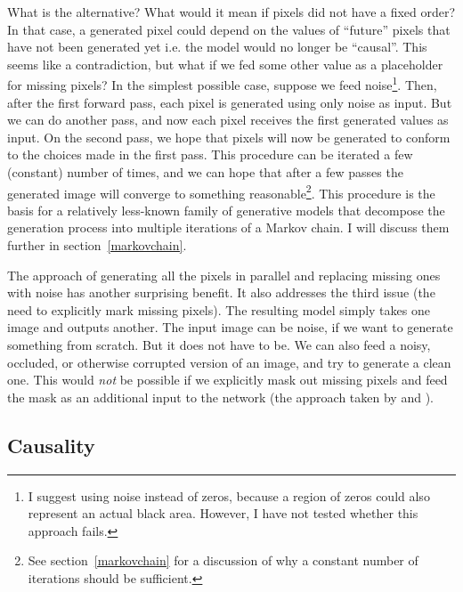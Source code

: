 \documentclass[11pt, a4paper, openany]{book}
\newcommand{\nquote}[1]{``{#1}''}
\begin{document}
What is the alternative? What would it mean if pixels did not have a fixed order? In that case, a generated pixel could depend on the values of \nquote{future} pixels that have not been generated yet i.e. the model would no longer be \nquote{causal}. This seems like a contradiction, but what if we fed some other value as a placeholder for missing pixels? In the simplest possible case, suppose we feed noise\footnote{I suggest using noise instead of zeros, because a region of zeros could also represent an actual black area. However, I have not tested whether this approach fails.}. Then, after the first forward pass, each pixel is generated using only noise as input. But we can do another pass, and now each pixel receives the first generated values as input. On the second pass, we hope that pixels will now be generated to conform to the choices made in the first pass. This procedure can be iterated a few (constant) number of times, and we can hope that after a few passes the generated image will converge to something reasonable\footnote{See section~\ref{markovchain} for a discussion of why a constant number of iterations should be sufficient.}. This procedure is the basis for a relatively less-known family of generative models that decompose the generation process into multiple iterations of a Markov chain. I will discuss them further in section~\ref{markovchain}.

The approach of generating all the pixels in parallel and replacing missing ones with noise has another surprising benefit. It also addresses the third issue (the need to explicitly mark missing pixels). The resulting model simply takes one image and outputs another. The input image can be noise, if we want to generate something from scratch. But it does not have to be. We can also feed a noisy, occluded, or otherwise corrupted version of an image, and try to generate a clean one. This would \emph{not} be possible if we explicitly mask out missing pixels and feed the mask as an additional input to the network (the approach taken by \citet{dnade} and \citet{gsnnade}).

\subsection{Causality}
\end{document}
